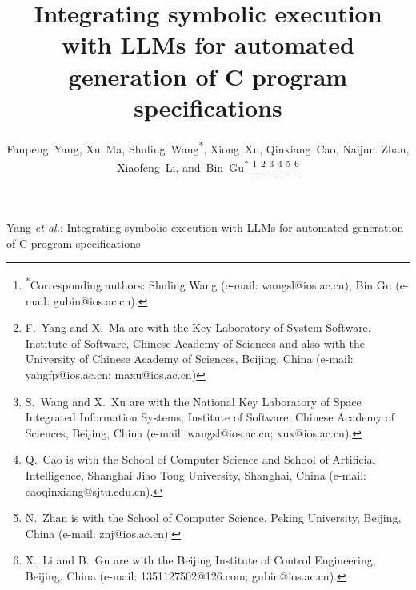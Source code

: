 \documentclass[lettersize,journal]{IEEEtran}
\begin{document}
\title{Integrating symbolic execution with LLMs for automated generation of C program specifications}

\author{Fanpeng~Yang,
        Xu~Ma,
        Shuling~Wang\textsuperscript{*},
        Xiong~Xu,
        Qinxiang~Cao,
        Naijun~Zhan,
        Xiaofeng~Li,
        and~Bin~Gu\textsuperscript{*}%
\thanks{\textsuperscript{*}Corresponding authors: Shuling Wang (e-mail: wangsl@ios.ac.cn), Bin Gu (e-mail: gubin@ios.ac.cn).}%
\thanks{F.~Yang and X.~Ma are  with the Key Laboratory of System Software, Institute of
Software, Chinese Academy of Sciences  and also with the University of Chinese Academy
of Sciences, Beijing, China
(e-mail: yangfp@ios.ac.cn; maxu@ios.ac.cn)}
\thanks{S.~Wang and X.~Xu are with  the National Key
Laboratory of Space Integrated Information Systems,  Institute of Software,
Chinese Academy of Sciences, Beijing, China
(e-mail: wangsl@ios.ac.cn; xux@ios.ac.cn).}%
\thanks{Q.~Cao is with the School of Computer Science and School of Artificial
Intelligence, Shanghai Jiao Tong University, Shanghai, China
(e-mail: caoqinxiang@sjtu.edu.cn).}%
\thanks{N.~Zhan is with the School of Computer Science, Peking University,
Beijing, China (e-mail: znj@ios.ac.cn).}%
\thanks{X.~Li and B.~Gu are with the Beijing Institute of Control Engineering,
Beijing, China (e-mail: 1351127502@126.com; gubin@ios.ac.cn).}}

%
{Yang \MakeLowercase{\textit{et al.}}: Integrating symbolic execution with LLMs for automated generation of C program specifications}

\maketitle
\end{document}
